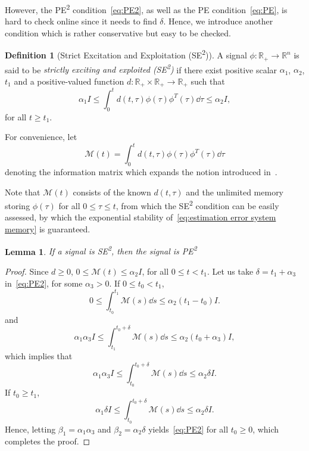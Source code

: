 \documentclass[]{IEEEtran}
\newtheorem{lemma}{Lemma}
\theoremstyle{definition}
\newtheorem{definition}{Definition}
\theoremstyle{remark}
\newcommand{\MB}[1]{\mathbb{#1}}
\newcommand{\MC}[1]{\mathcal{#1}}
\newcommand{\tsup}[1]{\textsuperscript{#1}}
\begin{document}
However, the PE\tsup{2} condition~\eqref{eq:PE2}, as well as the PE
condition~\eqref{eq:PE}, is hard to check online since it needs to find
$\delta$. Hence, we introduce another condition which is rather
conservative but easy to be checked.

\begin{definition}[Strict Excitation and Exploitation (SE\tsup{2})]
	A signal $\phi: \MB{R}_{+} \to \MB{R}^n$ is said to be \textit{strictly
	exciting and exploited (SE\tsup{2})} if there exist positive
	scalar $\alpha_1$, $\alpha_2$, $t_1$ and a positive-valued function $d :
	\MB{R}_{+} \times \MB{R}_{+} \to \MB{R}_{+}$ such that
	\begin{equation}\label{eq:SE2}
		\alpha_1 I \le \int_{0}^t d(t, \tau) \phi(\tau) \phi^T(\tau) \dd{\tau}
		\le \alpha_2 I,
	\end{equation}
	for all $t \ge t_1$.
\end{definition}

For convenience, let
\begin{equation}\label{eq:information matrix}
	\MC{M}(t) = \int_0^t d(t, \tau) \phi(\tau) \phi^T(\tau) \dd{\tau}
\end{equation}
denoting the information matrix which expands the notion introduced
in~\cite{cho_composite_2018}.

Note that $\MC{M}(t)$ consists of the known $d(t, \tau)$ and
the unlimited memory storing $\phi(\tau)$ for all $0 \le \tau \le t$, from
which the SE\tsup{2} condition can be easily assessed, by which the exponential
stability of~\eqref{eq:estimation error system memory} is guaranteed.

\begin{lemma}\label{lem:SE2 then PE2}
	If a signal is SE\tsup{2}, then the signal is PE\tsup{2}
\end{lemma}

\begin{proof}
	Since $d \ge 0$, $0 \le \MC{M}(t) \le \alpha_2 I$, for all $0 \le t <
	t_1$. Let us take $\delta = t_1 + \alpha_3$ in~\eqref{eq:PE2}, for some
	$\alpha_3 > 0$. If $0 \le t_0 < t_1$,
	\begin{equation*}
		0 \le \int_{t_0}^{t_1} {\MC{M}(s)} \dd{s} \le \alpha_2 (t_1 - t_0) I.
	\end{equation*}
	and
	\begin{equation*}
		\alpha_1 \alpha_3 I \le \int_{t_1}^{t_0 + \delta} {\MC{M}(s)} \dd{s} \le
		\alpha_2 (t_0 + \alpha_3) I,
	\end{equation*}
	which implies that
	\begin{equation*}
		\alpha_1 \alpha_3 I \le \int_{t_0}^{t_0 + \delta} {\MC{M}(s)} \dd{s} \le
		\alpha_2 \delta I.
	\end{equation*}
	If $t_0 \ge t_1$,
	\begin{equation*}
		\alpha_1 \delta I \le \int_{t_0}^{t_0 + \delta} {\MC{M}(s)} \dd{s} \le
		\alpha_2 \delta I.
	\end{equation*}
	Hence, letting $\beta_1 = \alpha_1 \alpha_3$ and $\beta_2 = \alpha_2 \delta$
	yields~\eqref{eq:PE2} for all $t_0 \ge 0$, which completes the proof.
\end{proof}
\end{document}

